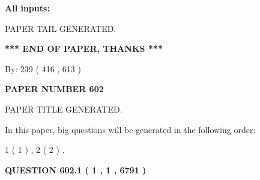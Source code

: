 \documentclass[12pt]{article}
\begin{document}
   
   
   
\noindent{}
   
   
   
   
\noindent\vspace{0.1in}\hspace{-0.08in} {\textbf{\Large{All inputs: }}}
   
   
   
   
   
   
 \vspace{0.2in}
 
   
   
\vspace{2.0in} PAPER TAIL GENERATED.
   
   
   
   
\vspace{1.0in} 
{\textbf{\large{ *** END OF PAPER, THANKS *** }}} 
   
   
\hspace{1.0in} By: 
 239 ( 416 ,  613 )
   
   
   
   
\newpage 
\setcounter{page}{ 
   602001 } 
   
   
   
   
 {\textbf{ \Large{ PAPER NUMBER  602  }}}
   
   
\vspace{0.2in}
   
   
   
   
   
   
   
   
 \vspace{0.2in}
 
 
 
 
   
   
 PAPER TITLE GENERATED.
   
   
   
\vspace{0.2in}
   
In this paper, big questions will be generated in the following order: 
   
   
   1 ( 1 )
 ,
   2 ( 2 )
 .
  
\vspace{0.2in}
  
{\textbf{\Large{QUESTION
602.1 
 ( 1 , 1 , 6791 )
}}}
  
\end{document}
